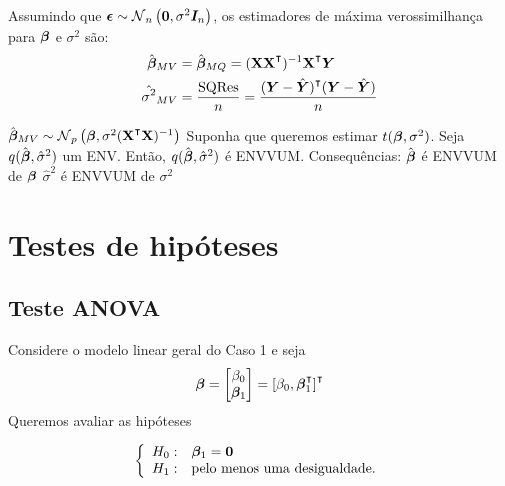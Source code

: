 \begin{theorem}
	Assumindo que $\v{\epsilon} \sim \normdist[n]{\v{0}, \sigma^2\v{I}_n}$, os estimadores de máxima verossimilhança para $\bm{\beta}$ e $\sigma^2$ são:
	\begin{align}
		\hat{\v{\beta}}_{MV} &= \hat{\v{\beta}}_{MQ} = (\m{X}\m{X}\T)\inv\m{X}\T \v{Y} \\
		\hat{\sigma^2}_{MV} &= \frac{\sqres}{n} = \frac{(\v{Y}-\hat{\v{Y}})\T(\v{Y}-\hat{\v{Y}})}{n}
	\end{align}
\end{theorem}


\begin{theorem}
	\leavevmode
	\begin{outline}[enumerate]
		\1 \( \hat{\v{\beta}}_{MV} \sim \normdist[p]{\v{\beta}, \sigma^2(\m{X}\T\m{X})\inv} \)
		\1 Suponha que queremos estimar $t(\bm{\beta}, \sigma^2)$. Seja $q(\hat{\bm{\beta}}, \hat{\sigma}^2)$ um ENV. Então, $q(\hat{\bm{\beta}}, \hat{\sigma}^2)$ é ENVVUM. Consequências:
			\2 $\hat{\bm{\beta}}$ é ENVVUM de $\bm{\beta}$
			\2 $\hat{\sigma}^2$ é ENVVUM de $\sigma^2$
	\end{outline}
\end{theorem}

\section{Testes de hipóteses}

\subsection{Teste ANOVA}
 
 Considere o modelo linear geral do Caso 1 e seja
\begin{equation}
	\v{\beta} = \begin{bmatrix}
		\beta_ 0 \\ 
		\v{\beta}_1
	\end{bmatrix} = [\beta_0, \v{\beta}_1\T]\T
\end{equation} 
 Queremos avaliar as hipóteses
 
 \begin{equation}
 	\left\{ \begin{array}{ll} 
 		H_0: & \bm{\beta}_1 = \bm{0} \\
 		H_1: & \text{pelo menos uma desigualdade}.
 	\end{array} \right.
 \end{equation}
       
